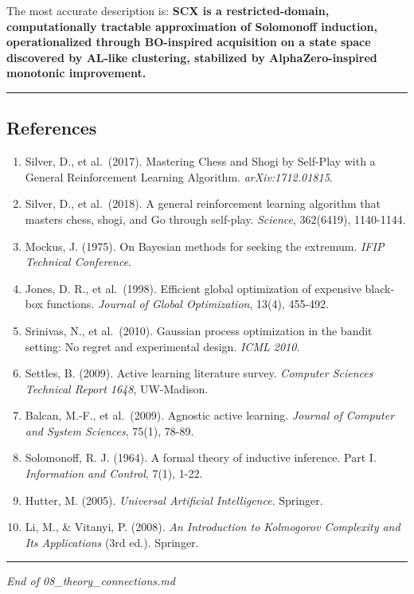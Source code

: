 \documentclass[
  12pt,
]{article}
\providecommand{\tightlist}{%
  \setlength{\itemsep}{0pt}\setlength{\parskip}{0pt}}
\begin{document}
The most accurate description is: \textbf{SCX is a restricted-domain,
computationally tractable approximation of Solomonoff induction,
operationalized through BO-inspired acquisition on a state space
discovered by AL-like clustering, stabilized by AlphaZero-inspired
monotonic improvement.}

\begin{center}\rule{0.5\linewidth}{0.5pt}\end{center}

\subsection{References}\label{references}

\begin{enumerate}
\def\labelenumi{\arabic{enumi}.}
\tightlist
\item
  Silver, D., et al.~(2017). Mastering Chess and Shogi by Self-Play with
  a General Reinforcement Learning Algorithm. \emph{arXiv:1712.01815}.
\item
  Silver, D., et al.~(2018). A general reinforcement learning algorithm
  that masters chess, shogi, and Go through self-play. \emph{Science},
  362(6419), 1140-1144.
\item
  Mockus, J. (1975). On Bayesian methods for seeking the extremum.
  \emph{IFIP Technical Conference}.
\item
  Jones, D. R., et al.~(1998). Efficient global optimization of
  expensive black-box functions. \emph{Journal of Global Optimization},
  13(4), 455-492.
\item
  Srinivas, N., et al.~(2010). Gaussian process optimization in the
  bandit setting: No regret and experimental design. \emph{ICML 2010}.
\item
  Settles, B. (2009). Active learning literature survey. \emph{Computer
  Sciences Technical Report 1648}, UW-Madison.
\item
  Balcan, M.-F., et al.~(2009). Agnostic active learning. \emph{Journal
  of Computer and System Sciences}, 75(1), 78-89.
\item
  Solomonoff, R. J. (1964). A formal theory of inductive inference. Part
  I. \emph{Information and Control}, 7(1), 1-22.
\item
  Hutter, M. (2005). \emph{Universal Artificial Intelligence}. Springer.
\item
  Li, M., \& Vitanyi, P. (2008). \emph{An Introduction to Kolmogorov
  Complexity and Its Applications} (3rd ed.). Springer.
\end{enumerate}

\begin{center}\rule{0.5\linewidth}{0.5pt}\end{center}

\emph{End of 08\_theory\_connections.md}
\end{document}
